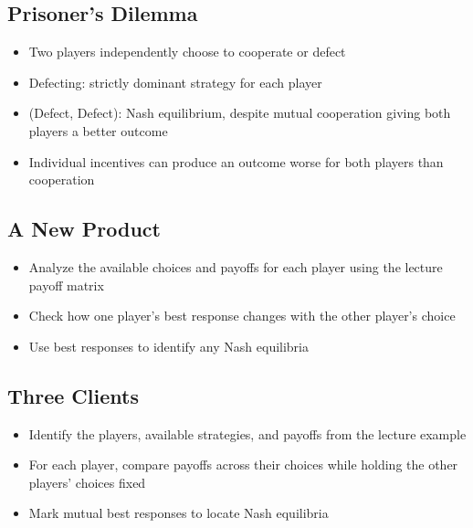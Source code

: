 \subsection{Prisoner's Dilemma}
\begin{itemize}
    \item Two players independently choose to cooperate or defect
    \item Defecting: strictly dominant strategy for each player
    \item (Defect, Defect): Nash equilibrium, despite mutual cooperation giving both players a better outcome
    \item Individual incentives can produce an outcome worse for both players than cooperation
\end{itemize}

\subsection{A New Product}
\begin{itemize}
    \item Analyze the available choices and payoffs for each player using the lecture payoff matrix
    \item Check how one player's best response changes with the other player's choice
    \item Use best responses to identify any Nash equilibria
\end{itemize}

\subsection{Three Clients}
\begin{itemize}
    \item Identify the players, available strategies, and payoffs from the lecture example
    \item For each player, compare payoffs across their choices while holding the other players' choices fixed
    \item Mark mutual best responses to locate Nash equilibria
\end{itemize}

